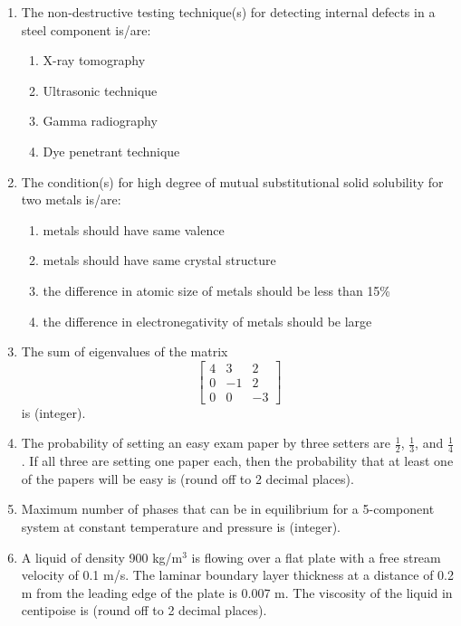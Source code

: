 \documentclass[12pt]{article}
\begin{document}
\begin{enumerate}
\item The non-destructive testing technique(s) for detecting internal defects in a steel component is/are:
\begin{enumerate}[label=(\alph*)]
\item X-ray tomography
\item Ultrasonic technique
\item Gamma radiography
\item Dye penetrant technique
\end{enumerate}

\item The condition(s) for high degree of mutual substitutional solid solubility for two metals is/are:
\begin{enumerate}[label=(\alph*)]
\item metals should have same valence
\item metals should have same crystal structure
\item the difference in atomic size of metals should be less than 15\%
\item the difference in electronegativity of metals should be large
\end{enumerate}

\item The sum of eigenvalues of the matrix
\[
\begin{bmatrix}
4 & 3 & 2 \\
0 & -1 & 2 \\
0 & 0 & -3
\end{bmatrix}
\]
is \underline{\hspace{2cm}} (integer).

\item The probability of setting an easy exam paper by three setters are \(\frac{1}{2}\), \(\frac{1}{3}\), and \(\frac{1}{4}\). If all three are setting one paper each, then the probability that at least one of the papers will be easy is \underline{\hspace{2cm}} (round off to 2 decimal places).

\item Maximum number of phases that can be in equilibrium for a 5-component system at constant temperature and pressure is \underline{\hspace{2cm}} (integer).

\item A liquid of density 900 kg/m\(^3\) is flowing over a flat plate with a free stream velocity of 0.1 m/s. The laminar boundary layer thickness at a distance of 0.2 m from the leading edge of the plate is 0.007 m. The viscosity of the liquid in centipoise is \underline{\hspace{2cm}} (round off to 2 decimal places).


\end{enumerate}
\end{document}
